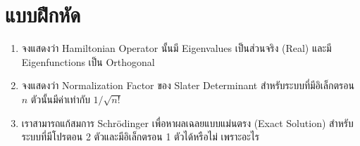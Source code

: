 \section{แบบฝึกหัด}

\begin{enumerate}[topsep=0pt,noitemsep]
  \setlength\itemsep{1em}
  \item จงแสดงว่า Hamiltonian Operator นั้นมี Eigenvalues เป็นส่วนจริง (Real) และมี Eigenfunctions เป็น Orthogonal

  \item จงแสดงว่า Normalization Factor ของ Slater Determinant สำหรับระบบที่มีอิเล็กตรอน $n$ ตัวนั้นมีค่าเท่ากับ $1 / \sqrt{n!}$
  
  \item เราสามารถแก้สมการ Schr\"{o}dinger เพื่อหาผลเฉลยแบบแม่นตรง (Exact Solution) สำหรับระบบที่มีโปรตอน 2 ตัวและมีอิเล็กตรอน 
  1 ตัวได้หรือไม่ เพราะอะไร
\end{enumerate}
